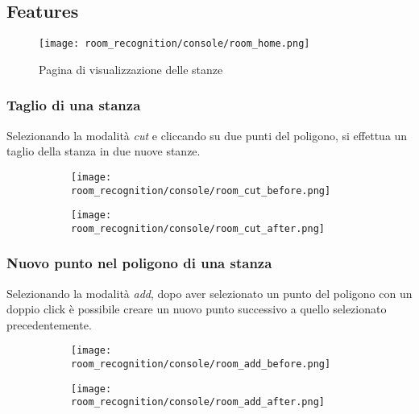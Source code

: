 \subsection{Features}
\begin{figure}[H]
  \centering
  \texttt{[image: room\_recognition/console/room\_home.png]}
  \caption{Pagina di visualizzazione delle stanze}
\end{figure}

\protect
\subsubsection{Taglio di una stanza}
Selezionando la modalità \textit{cut} e cliccando su due punti del poligono, si effettua un taglio della stanza in due nuove stanze.
\begin{figure}[H]
  \begin{subfigure}[t]{0.50\textwidth}
    \centering
    \texttt{[image: room\_recognition/console/room\_cut\_before.png]}
  \end{subfigure}
  \begin{subfigure}[t]{0.50\textwidth}
    \centering
    \texttt{[image: room\_recognition/console/room\_cut\_after.png]}
  \end{subfigure}
\end{figure}

\protect
\subsubsection{Nuovo punto nel poligono di una stanza}
Selezionando la modalità \textit{add}, dopo aver selezionato un punto del poligono con un doppio click è possibile creare un nuovo punto successivo a quello selezionato precedentemente.
\begin{figure}[H]
  \begin{subfigure}[t]{0.50\textwidth}
    \centering
    \texttt{[image: room\_recognition/console/room\_add\_before.png]}
  \end{subfigure}
  \begin{subfigure}[t]{0.50\textwidth}
    \centering
    \texttt{[image: room\_recognition/console/room\_add\_after.png]}
  \end{subfigure}
\end{figure}

\protect

